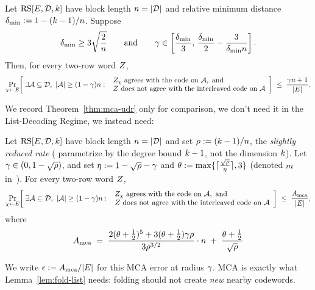 \begin{theorem}\label{thm:mca-udr}
Let $\mathrm{RS}[E,\mathcal{D},k]$ have block length $n = |\mathcal{D}|$ and relative minimum distance $\delta_{\min} := 1 - (k-1)/n$. Suppose
\[
\delta_{\min} \ge 3\sqrt{\frac{2}{n}}
\qquad\text{and}\qquad
\gamma \in \left[\frac{\delta_{\min}}{3},\,\frac{\delta_{\min}}{2} - \frac{3}{\delta_{\min} n}\right].
\]
Then, for every two-row word $Z$,
\[
\Pr_{\chi \leftarrow E}\!\left[\; \exists \mathcal{A} \subseteq \mathcal{D},\ |\mathcal{A}| \ge (1-\gamma) n :\ \begin{array}{l} Z_\chi \text{ agrees with the code on } \mathcal{A}, \text{ and} \\ Z \text{ does not agree with the interleaved code on } \mathcal{A} \end{array} \right]
\;\le\; \frac{\gamma n + 1}{|E|}.
\]
\end{theorem}

We record Theorem~\ref{thm:mca-udr} only for comparison, we don't need it in the List-Decoding Regime, we instead need:

\begin{theorem}\label{thm:mca-johnson}
Let $\mathrm{RS}[E,\mathcal{D},k]$ have block length $n = |\mathcal{D}|$ and set $\rho := (k-1)/n$, the \emph{slightly reduced rate} (\cite{BCHKS25} parametrize by the degree bound $k - 1$, not the dimension $k$). Let $\gamma \in (0, 1-\sqrt{\rho})$, and set $\eta := 1 - \sqrt{\rho} - \gamma$ and $\theta := \max\{\lceil \tfrac{\sqrt{\rho}}{\eta} \rceil, 3\}$ (denoted $m$ in~\cite{BCHKS25}). For every two-row word $Z$,
\[
\Pr_{\chi \leftarrow E}\!\left[\; \exists \mathcal{A} \subseteq \mathcal{D},\ |\mathcal{A}| \ge (1-\gamma) n :\ \begin{array}{l} Z_\chi \text{ agrees with the code on } \mathcal{A}, \text{ and} \\ Z \text{ does not agree with the interleaved code on } \mathcal{A} \end{array} \right] \;\le\; \frac{A_{\mathrm{mca}}}{|E|},
\]
where
\[
A_{\mathrm{mca}} \;=\; \frac{2(\theta + \tfrac12)^5 + 3(\theta + \tfrac12)\gamma\rho}{3\rho^{3/2}} \cdot n \;+\; \frac{\theta + \tfrac12}{\sqrt{\rho}}
\]
\end{theorem}

We write $\epsilon := A_{\mathrm{mca}}/|E|$ for this MCA error at radius $\gamma$. MCA is exactly what Lemma~\ref{lem:fold-list} needs: folding should not create \emph{new} nearby codewords.


